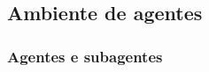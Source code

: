 \subsection{Ambiente de agentes}
\label{subsec:ambiente}

\subsubsection{Agentes e subagentes}
\label{subsubsec:agentes}

%
%

